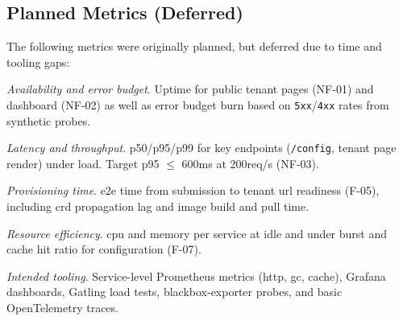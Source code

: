 \documentclass[11pt, a4paper, oneside, listof=totoc]{scrartcl}
\begin{document}
        \subsection{Planned Metrics (Deferred)}\label{subsec:evalPlannedMetrics}
            The following metrics were originally planned, but deferred due to time and tooling
            gaps:
            \begin{enumerate}[label={[\arabic*]:},
                ref=Challenge~\arabic*,
                leftmargin=*,
                itemsep=0.6\baselineskip]

                \item\label{chal:plannedAvailability}
                    \textit{Availability and error budget}.
                    Uptime for public tenant pages (NF-01) and dashboard (NF-02) as well as error
                    budget burn based on \texttt{5xx}/\texttt{4xx} rates from synthetic probes.

                \item\label{chal:plannedLatency}
                    \textit{Latency and throughput}.
                    p50/p95/p99 for key endpoints (\texttt{/config}, tenant page render) under load.
                    Target p95 $\leq$ 600ms at 200req/s (NF-03).

                \item\label{chal:plannedProvisioningTime}
                    \textit{Provisioning time}.
                    \gls{e2e} time from submission to tenant \gls{url} readiness (F-05),
                    including \gls{crd} propagation lag and image build and pull time.

                \item\label{chal:plannedResourceEfficiency}
                    \textit{Resource efficiency}.
                    \gls{cpu} and memory per service at idle and under burst and cache hit ratio for
                    configuration (F-07).

                \item\label{chal:plannedTooling}
                    \textit{Intended tooling}.
                    Service-level Prometheus metrics (\gls{http}, \gls{gc}, cache), Grafana
                    dashboards, Gatling load tests, blackbox-exporter probes, and basic
                    OpenTelemetry traces.
            \end{enumerate}
\end{document}
